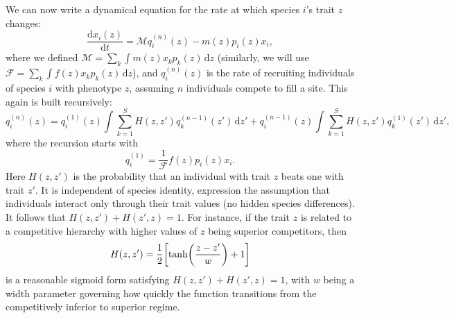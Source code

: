 \documentclass[11pt]{article}
\newcommand{\ud}{\text{d}}
\let\originalleft\left
\let\originalright\right
\renewcommand{\left}{\mathopen{}\mathclose\bgroup\originalleft}
\renewcommand{\right}{\aftergroup\egroup\originalright}
\begin{document}
We can now write a dynamical equation for the rate at which species $i$'s trait $z$ changes:
\begin{equation}
  \label{eq:xzdot_basic}
  \frac{\ud x_i(z)}{\ud t} = \mathcal{M} q_i^{(n)}(z) - m(z) p_i(z) x_i ,
\end{equation}
where we defined $\mathcal{M} = \sum_k \int m(z) x_k p_k(z) \,\ud z$ (similarly, we will use $\mathcal{F} = \sum_k \int f(z) x_k p_k(z) \,\ud z$), and $q_i^{(n)}(z)$ is the rate of recruiting individuals of species $i$ with phenotype $z$, assuming $n$ individuals compete to fill a site. This again is built recursively:
\begin{equation}
  \label{eq:qizn}
  q_i^{(n)}(z) = q_i^{(1)}(z) \int \sum_{k=1}^S H(z,z') q_k^{(n-1)}(z') \,\ud z' +
  q_i^{(n-1)}(z) \int \sum_{k=1}^S H(z,z') q_k^{(1)}(z') \,\ud z' ,
\end{equation}
where the recursion starts with
\begin{equation}
  \label{eq:qiz1}
  q_i^{(1)} = \frac{1}{\mathcal{F}} f(z) p_i(z) x_i .
\end{equation}
Here $H(z,z')$ is the probability that an individual with trait $z$ beats one with trait $z'$. It is independent of species identity, expression the assumption that individuals interact only through their trait values (no hidden species differences). It follows that $H(z,z') + H(z',z) = 1$. For instance, if the trait $z$ is related to a competitive hierarchy with higher values of $z$ being superior competitors, then
\begin{equation}
  \label{eq:H_example}
  H(z,z') = \frac{1}{2} \left[ \text{tanh}\left(\frac{z-z'}{w}\right) + 1\right]
\end{equation}
is a reasonable sigmoid form satisfying $H(z,z') + H(z',z) = 1$, with $w$ being a width parameter governing how quickly the function transitions from the competitively inferior to superior regime.
\end{document}
